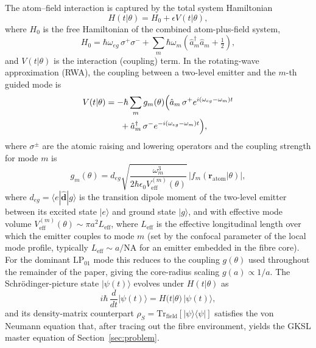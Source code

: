 \documentclass[journal,twocolumn]{IEEEtran}
\theoremstyle{definition}
\theoremstyle{plain}
\newcommand{\Tr}{\mathrm{Tr}}
\begin{document}
The atom--field interaction is captured by the total system
Hamiltonian
\begin{equation}
  H(t|\theta) = H_0 + \epsilon V(t|\theta),
  \label{eq:total_H}
\end{equation}
where $H_0$ is the free Hamiltonian of the combined
atom-plus-field system,
\begin{equation}
  H_0 = \hbar\omega_{eg}\,\sigma^+\sigma^-
    + \sum_m \hbar\omega_m\!\left(\hat{a}_m^\dagger\hat{a}_m
      + \tfrac{1}{2}\right),
  \label{eq:H0}
\end{equation}
and $V(t|\theta)$ is the interaction (coupling) term.  In the
rotating-wave approximation (RWA), the coupling between a
two-level emitter and the $m$-th guided mode is
\begin{align}
  V(t|\theta) &= -\hbar\sum_m g_m(\theta)
    \Bigl(\hat{a}_m\,\sigma^+ e^{i(\omega_{eg}-\omega_m)t}
    \nonumber\\
    &\hspace{1.7em} + \hat{a}_m^\dagger\,\sigma^- e^{-i(\omega_{eg}-\omega_m)t}
    \Bigr),
  \label{eq:Vt}
\end{align}
where $\sigma^\pm$ are the atomic raising and lowering operators and
the coupling strength for mode $m$ is
\begin{equation}
  g_m(\theta) = d_{eg}\sqrt{\frac{\omega_m^3}
    {2\hbar\epsilon_0 V_{\mathrm{eff}}^{(m)}(\theta)}}\,
  \bigl|f_m(\mathbf{r}_{\mathrm{atom}}|\theta)\bigr|,
  \label{eq:gm}
\end{equation}
where $d_{eg} = \langle e|\hat{\mathbf d}|g\rangle$ is the transition
dipole moment of the two-level emitter between its excited state
$|e\rangle$ and ground state $|g\rangle$, and with effective mode
volume $V_{\mathrm{eff}}^{(m)}(\theta) \sim
\pi a^2 L_{\mathrm{eff}}$, where $L_{\mathrm{eff}}$ is the effective
longitudinal length over which the emitter couples to mode $m$
(set by the confocal parameter of the local mode profile, typically
$L_{\mathrm{eff}} \sim a/\mathrm{NA}$ for an emitter embedded in the
fibre core).  For the dominant $\mathrm{LP}_{01}$
mode this reduces to the coupling $g(\theta)$ used throughout
the remainder of the paper, giving the core-radius scaling
$g(a)\propto 1/a$.  The Schr\"{o}dinger-picture state
$|\psi(t)\rangle$ evolves under $H(t|\theta)$ as
\begin{equation}
  i\hbar\,\frac{d}{dt}|\psi(t)\rangle
  = H(t|\theta)\,|\psi(t)\rangle,
  \label{eq:schrodinger}
\end{equation}
and its density-matrix counterpart $\rho_S = \Tr_{\mathrm{field}}
[|\psi\rangle\langle\psi|]$ satisfies the von Neumann equation that,
after tracing out the fibre environment, yields the GKSL master
equation of Section~\ref{sec:problem}.
\end{document}
